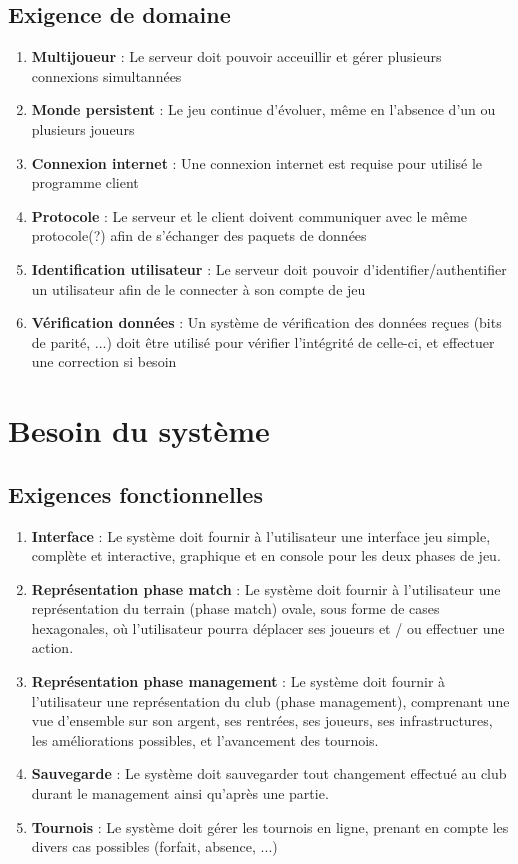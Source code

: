 \documentclass[a4paper]{article}
\begin{document}
\subsection{Exigence de domaine}
\begin{enumerate}
\item \textbf{Multijoueur} : Le serveur doit pouvoir acceuillir et gérer plusieurs connexions simultannées
\item \textbf{Monde persistent} : Le jeu continue d'évoluer, même en l'absence d'un ou plusieurs joueurs
\item \textbf{Connexion internet} : Une connexion internet est requise pour utilisé le programme client
\item \textbf{Protocole} : Le serveur et le client doivent communiquer avec le même protocole(?) afin de s'échanger des paquets de données
\item \textbf{Identification utilisateur} : Le serveur doit pouvoir d'identifier/authentifier un utilisateur afin de le connecter à son compte de jeu
\item \textbf{Vérification données} : Un système de vérification des données reçues (bits de parité, ...) doit être utilisé pour vérifier l'intégrité de celle-ci, et effectuer une correction si besoin
\end{enumerate}
\section{Besoin du système}
\subsection{Exigences fonctionnelles}

\begin{enumerate}
\item \textbf{Interface} : Le système doit fournir à l'utilisateur une interface jeu simple, complète et interactive, graphique et en console pour les deux phases de jeu.
\item \textbf{Représentation phase match} : Le système doit fournir à l'utilisateur une représentation du terrain (phase match) ovale, sous forme de cases hexagonales, où l'utilisateur pourra déplacer ses joueurs et / ou effectuer une action.
\item \textbf{Représentation phase management} : Le système doit fournir à l'utilisateur une représentation du \gls{club} (phase management), comprenant une vue d'ensemble sur son argent, ses rentrées, ses joueurs, ses infrastructures, les améliorations possibles, et l'avancement des tournois.
\item \textbf{Sauvegarde} : Le système doit sauvegarder tout changement effectué au \gls{club} durant le management ainsi qu'après une partie.
\item \textbf{Tournois} : Le système doit gérer les tournois en ligne, prenant en compte les divers cas possibles (forfait, absence, ...)
\end{enumerate}
\end{document}

